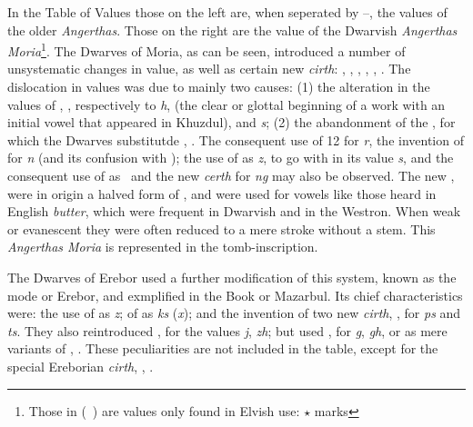 \bigskip

In the Table of Values those on the left are, when seperated by --, the
values of the older {\sl Angerthas}. Those on the right are the
value of the Dwarvish {\sl Angerthas Moria}\footnote{Those in (\ ) are
values only found in Elvish use: $\star$ marks}.
The Dwarves of Moria, as can be seen, introduced a number of unsystematic
changes in value, as well as certain new {\sl cirth}:
, , , , , . The dislocation in
values was due to mainly two causes:
(1) the alteration in the values of , ,  respectively to
{\sl h}, (the clear or glottal beginning of a work with an initial vowel
that appeared in Khuzdul), and {\sl s};
(2) the abandonment of the ,  for which the Dwarves substitutde
, . The consequent use of 12 for {\sl r},
the invention of  for {\sl n} (and its confusion with );
the use of  as {\sl z}, to go with  in its value {\sl s}, and
the consequent use of  as \nj\ and the new {\sl certh}  for {\sl ng}
may also be observed. The new ,  were in origin a halved form
of , and were used for vowels like those heard in English {\sl butter},
which were frequent in Dwarvish and in the Westron. When weak or evanescent
they were often reduced to a mere stroke without a stem. This {\sl Angerthas
Moria} is represented in the tomb-inscription.

The Dwarves of Erebor used a further modification of
this system, known as the mode or Erebor, and exmplified in the Book or
Mazarbul. Its chief characteristics were: the use of  as {\sl z};
of  as {\sl ks} ({\sl x}); and the invention of two new {\sl cirth},
,  for {\sl ps} and {\sl ts}. They also reintroduced ,
 for the values {\sl j}, {\sl zh}; but used ,  for
{\sl g}, {\sl gh}, or as mere variants of , . These peculiarities
are not included in the table, except for the special Ereborian {\sl cirth}, 
, .

